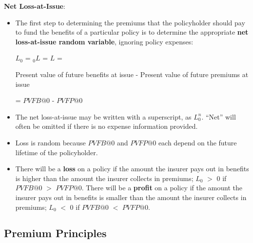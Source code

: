 \documentclass[]{book}
\begin{document}
\textbf{Net Loss-at-Issue}:

\begin{itemize}
\item
  The first step to determining the premiums that the policyholder
  should pay to fund the benefits of a particular policy is to determine
  the appropriate \textbf{net loss-at-issue random variable}, ignoring
  policy expenses:

  \(L_0\) = \({}_{0}L\) = \(L\) =

  Present value of future benefits at issue - Present value of future
  premiums at issue

  = \(PVFB@0\) - \(PVFP@0\)
\item
  The net loss-at-issue may be written with a superscript, as \(L^n_0\).
  ``Net'' will often be omitted if there is no expense information
  provided.
\item
  Loss is random because \(PVFB@0\) and \(PVFP@0\) each depend on the
  future lifetime of the policyholder.
\item
  There will be a \textbf{loss} on a policy if the amount the insurer
  pays out in benefits is higher than the amount the insurer collects in
  premiums; \(L_0\) \(>\) 0 if \(PVFB@0\) \(>\) \(PVFP@0\). There will
  be a \textbf{profit} on a policy if the amount the insurer pays out in
  benefits is smaller than the amount the insurer collects in premiums;
  \(L_0\) \(<\) 0 if \(PVFB@0\) \(<\) \(PVFP@0\).
\end{itemize}

\subsection{Premium Principles}\label{premium-principles}
\end{document}

